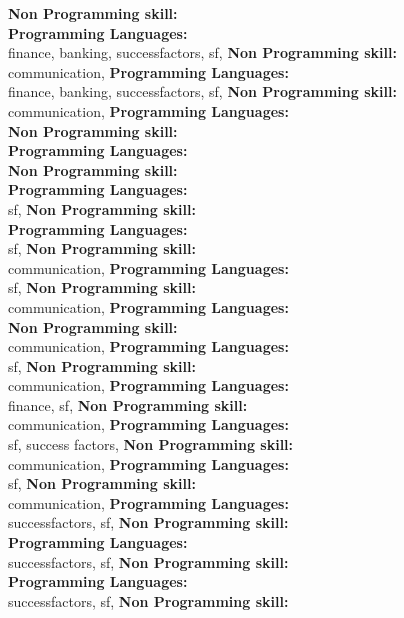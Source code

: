 \textbf{Non Programming skill:} \\
\textbf{Programming Languages:} \\
finance, banking, successfactors, sf, \textbf{Non Programming skill:} \\
communication, \textbf{Programming Languages:} \\
finance, banking, successfactors, sf, \textbf{Non Programming skill:} \\
communication, \textbf{Programming Languages:} \\
\textbf{Non Programming skill:} \\
\textbf{Programming Languages:} \\
\textbf{Non Programming skill:} \\
\textbf{Programming Languages:} \\
sf, \textbf{Non Programming skill:} \\
\textbf{Programming Languages:} \\
sf, \textbf{Non Programming skill:} \\
communication, \textbf{Programming Languages:} \\
sf, \textbf{Non Programming skill:} \\
communication, \textbf{Programming Languages:} \\
\textbf{Non Programming skill:} \\
communication, \textbf{Programming Languages:} \\
sf, \textbf{Non Programming skill:} \\
communication, \textbf{Programming Languages:} \\
finance, sf, \textbf{Non Programming skill:} \\
communication, \textbf{Programming Languages:} \\
sf, success factors, \textbf{Non Programming skill:} \\
communication, \textbf{Programming Languages:} \\
sf, \textbf{Non Programming skill:} \\
communication, \textbf{Programming Languages:} \\
successfactors, sf, \textbf{Non Programming skill:} \\
\textbf{Programming Languages:} \\
successfactors, sf, \textbf{Non Programming skill:} \\
\textbf{Programming Languages:} \\
successfactors, sf, \textbf{Non Programming skill:} \\
